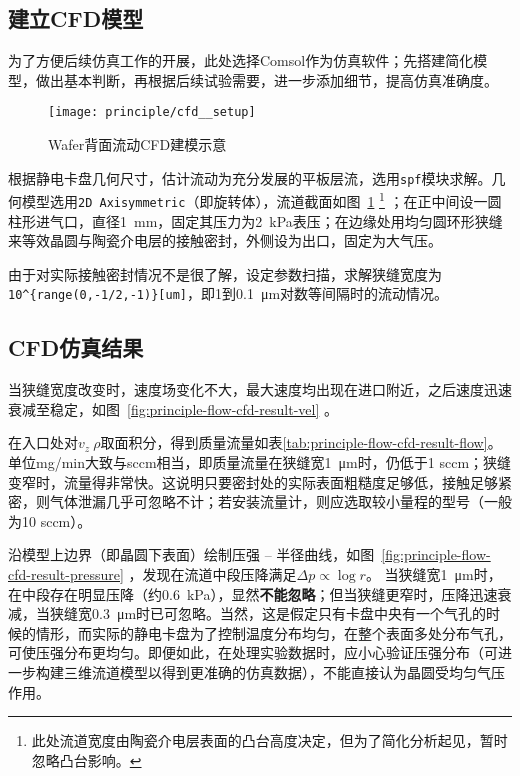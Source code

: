 \subsection{建立CFD模型}\label{sec:principle-flow-cfd-setup}

为了方便后续仿真工作的开展，此处选择Comsol作为仿真软件；先搭建简化模型，做出基本判断，再根据后续试验需要，进一步添加细节，提高仿真准确度。

\begin{figure}[hbt]
\centering
\texttt{[image: principle/cfd\_\_setup]}
\caption[CFD建模示意]{Wafer背面流动CFD建模示意}
\label{fig:principle-flow-cfd-setup}
\end{figure}

根据静电卡盘几何尺寸，估计流动为充分发展的平板层流，选用\verb|spf|模块求解。几何模型选用\verb|2D Axisymmetric|（即旋转体），流道截面如图~\ref{fig:principle-flow-cfd-setup} 
\footnote{此处流道宽度由陶瓷介电层表面的凸台高度决定，但为了简化分析起见，暂时忽略凸台影响。}
；在正中间设一圆柱形进气口，直径\SI{1}{\mm}，固定其压力为\SI{2}{\kPa}表压；在边缘处用均匀圆环形狭缝来等效晶圆与陶瓷介电层的接触密封，外侧设为出口，固定为大气压。

由于对实际接触密封情况不是很了解，设定参数扫描，求解狭缝宽度为\verb|10^{range(0,-1/2,-1)}[um]|，即1到\SI{0.1}{\micro\meter}对数等间隔时的流动情况。


\subsection{CFD仿真结果}\label{sec:principle-flow-cfd-result}

当狭缝宽度改变时，速度场变化不大，最大速度均出现在进口附近，之后速度迅速衰减至稳定，如图~\ref{fig:principle-flow-cfd-result-vel} 。


在入口处对$v_z\ \rho$取面积分，得到质量流量如表\ref{tab:principle-flow-cfd-result-flow}。单位\si[per-mode=symbol]{\mg\per\minute}大致与sccm相当，即质量流量在狭缝宽\SI{1}{\micro\meter}时，仍低于1 sccm；狭缝变窄时，流量得非常快。这说明只要密封处的实际表面粗糙度足够低，接触足够紧密，则气体泄漏几乎可忽略不计；若安装流量计，则应选取较小量程的型号（一般为10 sccm）。

沿模型上边界（即晶圆下表面）绘制压强 -- 半径曲线，如图~\ref{fig:principle-flow-cfd-result-pressure} ，发现在流道中段压降满足$\Delta p \propto \log{r}$。 %
当狭缝宽\SI{1}{\micro\meter}时，在中段存在明显压降（约\SI{0.6}{\kPa}），显然\textbf{不能忽略}；但当狭缝更窄时，压降迅速衰减，当狭缝宽\SI{0.3}{\micro\meter}时已可忽略。当然，这是假定只有卡盘中央有一个气孔的时候的情形，而实际的静电卡盘为了控制温度分布均匀，在整个表面多处分布气孔，可使压强分布更均匀。即便如此，在处理实验数据时，应小心验证压强分布（可进一步构建三维流道模型以得到更准确的仿真数据），不能直接认为晶圆受均匀气压作用。

